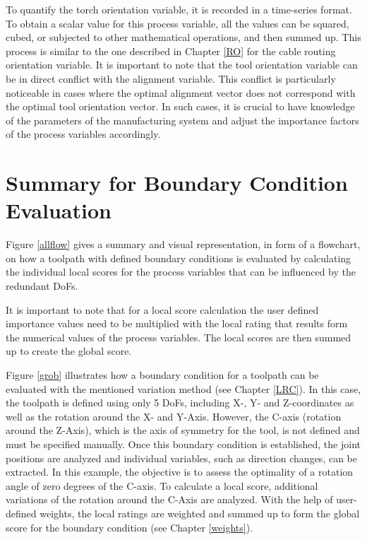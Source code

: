 \documentclass[conference]{IEEEtran}
\begin{document}
To quantify the torch orientation variable, it is recorded in a time-series format. To obtain a scalar value for this process variable, all the values can be squared, cubed, or subjected to other mathematical operations, and then summed up. This process is similar to the one described in Chapter \ref{RO} for the cable routing orientation variable. It is important to note that the tool orientation variable can be in direct conflict with the alignment variable. This conflict is particularly noticeable in cases where the optimal alignment vector does not correspond with the optimal tool orientation vector. In such cases, it is crucial to have knowledge of the parameters of the manufacturing system and adjust the importance factors of the process variables accordingly. 


\newpage
\section{Summary for Boundary Condition Evaluation}
Figure \ref{allflow} gives a summary and visual representation, in form of a flowchart, on how a toolpath with defined boundary conditions is evaluated by calculating the individual local scores for the process variables that can be influenced by the redundant DoFs.



It is important to note that for a local score calculation the user defined importance values need to be multiplied with the local rating that results form the numerical values of the process variables. The local scores are then summed up to create the global score.

Figure \ref{grob} illustrates how a boundary condition for a toolpath can be evaluated with the mentioned variation method (see Chapter \ref{LRC}). In this case, the toolpath is defined using only 5 DoFs, including X-, Y- and Z-coordinates as well as the rotation around the X- and Y-Axis. However, the C-axis (rotation around the Z-Axis), which is the axis of symmetry for the tool, is not defined and must be specified manually. Once this boundary condition is established, the joint positions are analyzed and individual variables, such as direction changes, can be extracted. In this example, the objective is to assess the optimality of a rotation angle of zero degrees of the C-axis. To calculate a local score, additional variations of the rotation around the C-Axis are analyzed. With the help of user-defined weights, the local ratings are weighted and summed up to form the global score for the boundary condition (see Chapter \ref{weights}).
\end{document}
